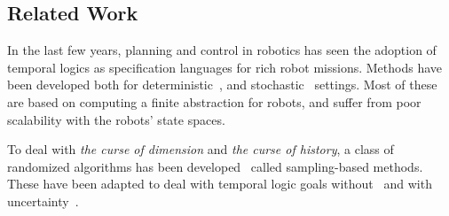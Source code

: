 \documentclass[conference]{IEEEtran}
\newcommand{\cristi}[1]{{\color{orange} [Cristi] #1}}
\begin{document}
	\subsection{Related Work}
	
	In the last few years, planning and control in robotics has seen the adoption of temporal logics
	as specification languages for rich robot missions.
	Methods have been developed both for deterministic~\cite{KB-TAC08-LTLCon,kress-gazit:whereswaldo?,Murray2009,VaBe-IROS-2013}, and
    stochastic~\cite{Lahijanian2012,svorenova2013,Ayala2014,Cristi-CDC-2016,Kaelbling98} settings.
    Most of these are based on computing a finite abstraction for robots, and suffer from
    poor scalability with the robots' state spaces.
    
    To deal with {\em the curse of dimension} and {\em the curse of history}, a class of randomized
    algorithms has been developed~\cite{KF-IJRR11,Kav96,platt2010,bry2011} called sampling-based methods.
    These have been adapted to deal with temporal logic goals without~\cite{bhatia2010sampling,VaBe-IROS-2013,vandenBerg11,Ali14-IJRR}
    and with uncertainty~\cite{Morteza-HSCC-2013,Cristi-CDC-2016,prentice2009}.
	
	
	
\end{document}
